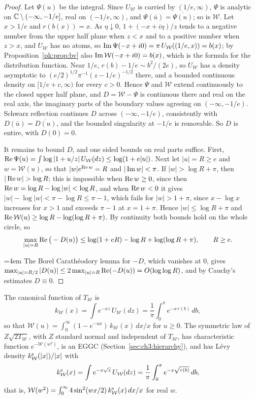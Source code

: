 \begin{proof}
Let $\Psi(u)$ be the integral. Since $U_{\mathcal W}$ is carried by $(1/e,\infty)$, $\Psi$ is analytic on $\mathbb{C}\setminus(-\infty,-1/e]$, real on $(-1/e,\infty)$, and $\Psi(\bar u)=\overline{\Psi(u)}$; so is $\mathcal W$. Let $x>1/e$ and $r(b(x))=x$. As $\eta\downarrow0$, $1+(-x+i\eta)/z$ tends to a negative number from the upper half plane when $z<x$ and to a positive number when $z>x$, and $U_{\mathcal W}$ has no atoms, so $\operatorname{Im}\Psi(-x+i0)=\pi\,U_{\mathcal W}((1/e,x))=b(x)$; by Proposition~\ref{pk:prop:bv} also $\operatorname{Im}\mathcal W(-x+i0)=b(x)$, which is the formula for the distribution function. Near $1/e$, $r(b)-1/e\sim b^2/(2e)$, so $U_{\mathcal W}$ has a density asymptotic to $(e/2)^{1/2}\pi^{-1}(z-1/e)^{-1/2}$ there, and a bounded continuous density on $[1/e+c,\infty)$ for every $c>0$. Hence $\Psi$ and $\mathcal W$ extend continuously to the closed upper half plane, and $D=\mathcal W-\Psi$ is continuous there and real on the real axis, the imaginary parts of the boundary values agreeing on $(-\infty,-1/e)$. Schwarz reflection continues $D$ across $(-\infty,-1/e)$, consistently with $D(\bar u)=\overline{D(u)}$, and the bounded singularity at $-1/e$ is removable. So $D$ is entire, with $D(0)=0$.

It remains to bound $D$, and one sided bounds on real parts suffice. First, $\operatorname{Re}\Psi(u)=\int\log|1+u/z|\,U_{\mathcal W}(dz)\le\log(1+e|u|)$. Next let $|u|=R\ge e$ and $w=\mathcal W(u)$, so that $|w|e^{\operatorname{Re} w}=R$ and $|\operatorname{Im} w|<\pi$. If $|w|>\log R+\pi$, then $|\re w|>\log R$; this is impossible when $\operatorname{Re} w\ge0$, since then $\operatorname{Re} w=\log R-\log|w|<\log R$, and when $\operatorname{Re} w<0$ it gives $|w|-\log|w|<\pi-\log R\le\pi-1$, which fails for $|w|>1+\pi$, since $x-\log x$ increases for $x>1$ and exceeds $\pi-1$ at $x=1+\pi$. Hence $|w|\le\log R+\pi$ and $\operatorname{Re}\mathcal W(u)\ge\log R-\log(\log R+\pi)$. By continuity both bounds hold on the whole circle, so
\[
\max_{|u|=R}\operatorname{Re}\big(-D(u)\big)\le\log(1+eR)-\log R+\log(\log R+\pi),\qquad R\ge e .
\]
{\emergencystretch=4em The Borel Carath\'eodory lemma for $-D$, which vanishes at $0$, gives $\max_{|u|=R/2}|D(u)|\le2\max_{|u|=R}\operatorname{Re}(-D(u))=O(\log\log R)$, and by Cauchy's estimates $D\equiv0$.\par}
\end{proof}

\begin{corollary}\label{pk:cor:levy}
The canonical function of $T_{\mathcal W}$ is
\[
k_{\mathcal W}(x)=\int e^{-xz}\,U_{\mathcal W}(dz)=\frac1\pi\int_0^\pi e^{-x\,r(b)}\,db,
\]
so that $\mathcal W(u)=\int_0^\infty(1-e^{-ux})\,k_{\mathcal W}(x)\,dx/x$ for $u\ge0$. The symmetric law of $Z\sqrt{2T_{\mathcal W}}$, with $Z$ standard normal and independent of $T_{\mathcal W}$, has characteristic function $e^{-\mathcal W(w^2)}$, is an EGGC (Section~\ref{sec:ch3:hierarchy}), and has L\'evy density $k^{\rm s}_{\mathcal W}(|x|)/|x|$ with
\[
k^{\rm s}_{\mathcal W}(x)=\int e^{-x\sqrt z}\,U_{\mathcal W}(dz)=\frac1\pi\int_0^\pi e^{-x\sqrt{r(b)}}\,db,
\]
that is, $\mathcal W(w^2)=\int_0^\infty4\sin^2(wx/2)\,k^{\rm s}_{\mathcal W}(x)\,dx/x$ for real $w$.
\end{corollary}

